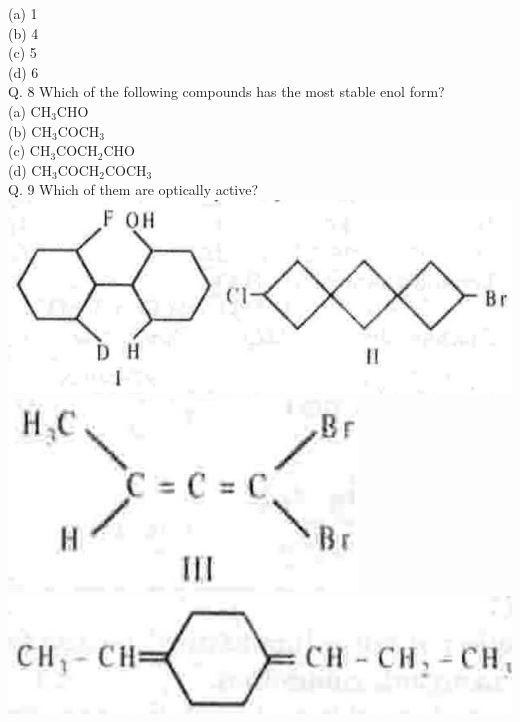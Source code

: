\documentclass[10pt]{article}
\begin{document}
(a) 1\\
(b) 4\\
(c) 5\\
(d) 6\\
Q. 8 Which of the following compounds has the most stable enol form?\\
(a) $\mathrm{CH}_{3} \mathrm{CHO}$\\
(b) $\mathrm{CH}_{3} \mathrm{COCH}_{3}$\\
(c) $\mathrm{CH}_{3} \mathrm{COCH}_{2} \mathrm{CHO}$\\
(d) $\mathrm{CH}_{3} \mathrm{COCH}_{2} \mathrm{COCH}_{3}$\\
Q. 9 Which of them are optically active?\\
\includegraphics[max width=\textwidth, center]{2025_01_28_8470952b98110cec3aabg-132(2)}\\
\includegraphics[max width=\textwidth, center]{2025_01_28_8470952b98110cec3aabg-132}\\
\includegraphics[max width=\textwidth, center]{2025_01_28_8470952b98110cec3aabg-132(1)}
\end{document}
